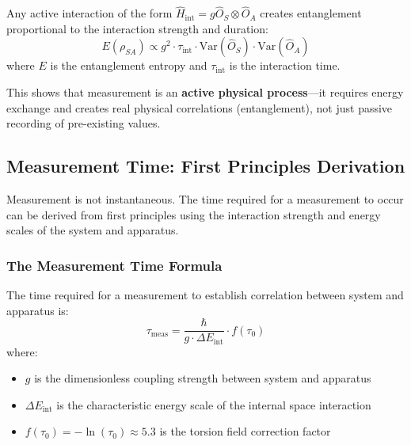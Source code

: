 \begin{theorem}
Any active interaction of the form $\hat{H}_{\text{int}} = g \hat{O}_S \otimes \hat{O}_A$ creates entanglement proportional to the interaction strength and duration:
\begin{equation}
    E(\rho_{SA}) \propto g^2 \cdot \tau_{\text{int}} \cdot \text{Var}(\hat{O}_S) \cdot \text{Var}(\hat{O}_A)
\end{equation}
where $E$ is the entanglement entropy and $\tau_{\text{int}}$ is the interaction time.
\end{theorem}

This shows that measurement is an \textbf{active physical process}—it requires energy exchange and creates real physical correlations (entanglement), not just passive recording of pre-existing values.

\subsection{Measurement Time: First Principles Derivation}

\begin{insight}
Measurement is not instantaneous. The time required for a measurement to occur can be derived from first principles using the interaction strength and energy scales of the system and apparatus.
\end{insight}

\subsubsection{The Measurement Time Formula}

\begin{theorem}
The time required for a measurement to establish correlation between system and apparatus is:
\begin{equation}
    \boxed{\tau_{\text{meas}} = \frac{\hbar}{g \cdot \Delta E_{\text{int}}} \cdot f(\tau_0)}
\end{equation}
where:
\begin{itemize}
    \item $g$ is the dimensionless coupling strength between system and apparatus
    \item $\Delta E_{\text{int}}$ is the characteristic energy scale of the internal space interaction
    \item $f(\tau_0) = -\ln(\tau_0) \approx 5.3$ is the torsion field correction factor
\end{itemize}
\end{theorem}

